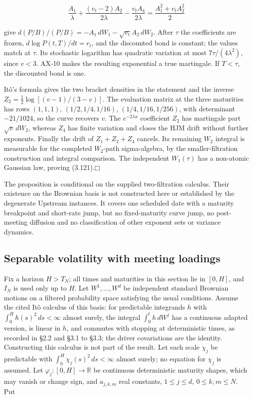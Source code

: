 \documentclass[11pt]{article}
\providecommand{\square}{\mdlgwhtsquare}
\begin{document}
\begin{equation*}
\frac{A_1}{\lambda}+\frac{(v_t-2)A_2}{2\lambda}-\frac{v_t A_4}{2\lambda}
=\frac{A_1^2+v_t A_2^2}{2} \tag{3.123}\label{eq:3.123}
\end{equation*}

give \(d(P/B)/(P/B)=-A_1\,dW_1-\sqrt{v_t}A_2\,dW_2\). After \(\tau\) the coefficients are frozen, \(d\log P(t,T)/dt=r_t\), and the discounted bond is constant; the values match at \(\tau\). Its stochastic logarithm has quadratic variation at most \(7\tau/(4\lambda^2)\), since \(v<3\). AX-10 makes the resulting exponential a true martingale. If \(T<\tau\), the discounted bond is one.

Itô's formula gives the two bracket densities in the statement and the inverse \(Z_2=\tfrac12\log[(v-1)/(3-v)]\). The evaluation matrix at the three maturities has rows \((1,1,1)\), \((1/2,1/4,1/16)\), \((1/4,1/16,1/256)\), with determinant \(-21/1024\), so the curve recovers \(v\). The \(e^{-2\lambda x}\) coefficient \(Z_2\) has martingale part \(\sqrt v\,dW_2\), whereas \(Z_4\) has finite variation and closes the HJM drift without further exponents. Finally the drift of \(Z_1+Z_2+Z_4\) cancels. Its remaining \(W_2\) integral is measurable for the completed \(W_2\)-path sigma-algebra, by the smaller-filtration construction and integral comparison. The independent \(W_1(\tau)\) has a non-atomic Gaussian law, proving (3.121).\hfill$\square$

The proposition is conditional on the supplied two-filtration calculus. Their existence on the Brownian basis is not constructed here or established by the degenerate Upstream instances. It covers one scheduled date with a maturity breakpoint and short-rate jump, but no fixed-maturity curve jump, no post-meeting diffusion and no classification of other exponent sets or variance dynamics.

\subsection{Separable volatility with meeting loadings}\label{sec:3.25}

Fix a horizon \(H>T_N\); all times and maturities in this section lie in \([0,H]\), and \(I_N\) is used only up to \(H\). Let \(W^1,\dots,W^d\) be independent standard Brownian motions on a filtered probability space satisfying the usual conditions. Assume the cited Itô calculus of this basis: for predictable integrands \(h\) with \(\int_0^H h(s)^2\,ds<\infty\) almost surely, the integral \(\int_0^t h\,dW^j\) has a continuous adapted version, is linear in \(h\), and commutes with stopping at deterministic times, as recorded in \cite{bauerschmidt2020stochastic} §2.2 and §3.1 to §3.3; the driver covariations are the identity. Constructing this calculus is not part of the result. Let each scale \(\chi_j\) be predictable with \(\int_0^H\chi_j(s)^2\,ds<\infty\) almost surely; no equation for \(\chi_j\) is assumed. Let \(\varphi_j:[0,H]\to\mathbb R\) be continuous deterministic maturity shapes, which may vanish or change sign, and \(a_{j,k,m}\) real constants, \(1\le j\le d\), \(0\le k,m\le N\). Put
\end{document}
